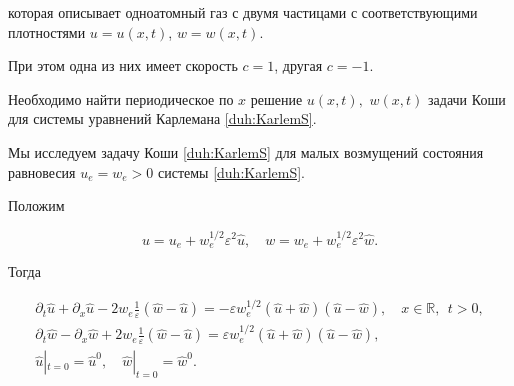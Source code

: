 которая описывает одноатомный газ с двумя частицами с соответствующими плотностями $u=u(x,t)$, $w=w(x,t).$ 

При этом одна из них имеет скорость $c=1$, другая $c=-1$.



\smallskip



\begin{task}Необходимо найти периодическое по $x$ решение $u(x,t),$ $w(x,t)$ задачи Коши для системы уравнений Карлемана \eqref{duh:KarlemS}$.$

\end{task}



\smallskip




Мы исследуем задачу Коши \eqref{duh:KarlemS} для малых возмущений состояния равновесия  $u_e=w_e>0$ системы \eqref{duh:KarlemS}. 

Положим

\begin{equation}

u=u_e+w_e^{1/2}\varepsilon^2\widehat{u}, 

\quad 

w=w_e+w_e^{1/2}\varepsilon^2\widehat{w}.

\label{duh:uw0}

\end{equation}

Тогда

\begin{gather}

\partial_t\widehat{u}+\partial_x\widehat{u}-2w_e\frac1\varepsilon(\widehat{w}

-\widehat{u})=-\varepsilon w_e^{1/2}(\widehat{u}+\widehat{w})(\widehat{u}-\widehat{w}), \quad  x\in \mathbb R, ~~ t>0,

\\

\partial_t\widehat{w}-\partial_x\widehat{w}+2w_e\frac1\varepsilon(\widehat{w}

-\widehat{u})=\varepsilon w_e^{1/2}(\widehat{u}+\widehat{w})(\widehat{u}-\widehat{w}),

\label{duh:PertKarlem}

\\

\widehat{u}|_{t=0}=\widehat{u}^0,

\quad 

\widehat{w}|_{t=0}=\widehat{w}^0.

\end{gather}

